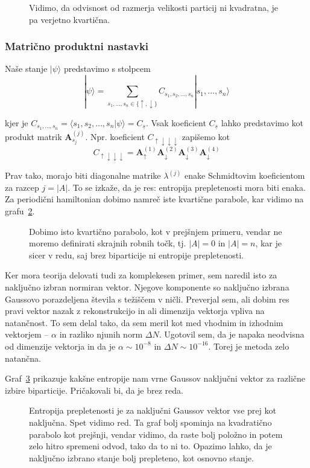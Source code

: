 \documentclass[12pt, a4paper]{article}
\newcommand{\A}{
	\ensuremath{\mathbf{A}}
}
\begin{document}
\begin{figure}[H]\centering
	
	\caption{Vidimo, da odvisnost od razmerja velikosti particij ni kvadratna, je pa verjetno kvarti\v cna.}
	\label{1-ni-parabola-a}
\end{figure}

\subsubsection{Matri\v cno produktni nastavki}

Na\v se stanje $|\psi\rangle$ predstavimo s stolpcem
\[
	|\psi\rangle = \sum_{s_1,\ldots,s_n \in \{\uparrow,\downarrow\}} C_{s_1,s_2,\ldots,s_n} |s_1,\ldots,s_n\rangle
\]

kjer je $C_{s_1,\ldots,s_n} = \langle s_1,s_2,\ldots,s_n|\psi\rangle = C_{\underline{s}}$. Vsak koeficient
$C_{\underline{s}}$ lahko predstavimo kot produkt matrik $\mathbf{A}^{(j)}_{s_j}$. Npr. koeficient
$C_{\uparrow\downarrow\downarrow\downarrow}$ zapi\v semo kot
\[
	C_{\uparrow\downarrow\downarrow\downarrow} = \A^{(1)}_\uparrow\A^{(2)}_\downarrow\A^{(3)}_\downarrow\A^{(4)}_\downarrow
\]

Prav tako, morajo biti diagonalne matrike $\lambda^{(j)}$ enake Schmidtovim koeficientom za razcep $j = |A|$. To se izka\v ze,
da je res: entropija prepletenosti mora biti enaka. Za periodi\v cni hamiltonian dobimo namre\v c iste kvarti\v cne parabole,
kar vidimo na grafu~\ref{2-periodicni-aji}.

\begin{figure}[H]\centering
	
	\caption{Dobimo isto kvarti\v cno parabolo, kot v prej\v snjem primeru, vendar ne moremo definirati skrajnih
		robnih to\v ck, tj. $|A| = 0$ in $|A| = n$, kar je sicer v redu, saj brez biparticije ni entropije
		prepletenosti.}
	\label{2-periodicni-aji}
\end{figure}

Ker mora teorija delovati tudi za komplekesen primer, sem naredil isto za  naklju\v cno izbran normiran vektor. Njegove
komponente so naklju\v cno izbrana Gaussovo porazdeljena \v stevila s te\v zi\v s\v cem v ni\v cli. Preverjal sem, ali
dobim res pravi vektor nazak z rekonstrukcijo in ali dimenzija vektorja vpliva na natan\v cnost. To sem delal tako, da
sem meril kot med vhodnim in izhodnim vektorjem -- $\alpha$ in razliko njunih norm $\Delta N$. Ugotovil sem, da je napaka
neodvisna od dimenzije vektorja in da je $\alpha \sim 10^{-8}$ in $\Delta N \sim 10^{-16}$. Torej je metoda zelo natan\v cna.

Graf~\ref{2-gaus} prikazuje kak\v sne entropije nam vrne Gaussov naklju\v cni vektor za razli\v cne izbire biparticije.
Pri\v cakovali bi, da je brez reda.

\begin{figure}[H]\centering
	
	\caption{Entropija prepletenosti je za naklju\v cni Gaussov vektor vse prej kot naklju\v cna. Spet vidimo
		red. Ta graf bolj spominja na kvadrati\v cno parabolo kot prej\v snji, vendar vidimo, da raste bolj polo\v zno
		in potem zelo hitro spremeni odvod, tako da to ni to. Opazimo lahko, da je naklju\v cno izbrano stanje bolj
		prepleteno, kot osnovno stanje.}
	\label{2-gaus}
\end{figure}
\end{document}

